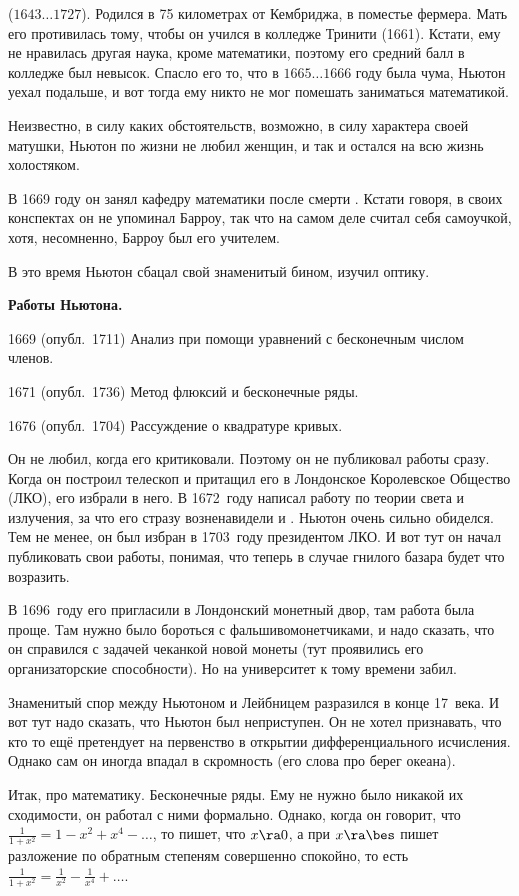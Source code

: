 \documentclass[a4paper,oneside,fleqn,10pt]{article}
\newcommand{\pe}[2]{${#1}\ldots{#2}$}
\begin{document}
 (\pe{1643}{1727}). Родился в 75
километрах от Кембриджа, в поместье фермера. Мать его противилась
тому, чтобы он учился в колледже Тринити (1661).  Кстати, ему не
нравилась другая наука, кроме математики, поэтому его средний балл в
колледже был невысок.  Спасло его то, что в \pe{1665}{1666} году была
чума, Ньютон уехал подальше, и вот тогда ему никто не мог помешать
заниматься математикой.

Неизвестно, в силу каких обстоятельств, возможно, в силу характера
своей матушки, Ньютон по жизни не любил женщин, и так и остался на всю
жизнь холостяком.

В 1669 году он занял кафедру математики после смерти .
Кстати говоря, в своих конспектах он не упоминал Барроу, так что на
самом деле считал себя самоучкой, хотя, несомненно, Барроу был его
учителем.

В это время Ньютон сбацал свой знаменитый бином, изучил оптику.


\textbf{Работы Ньютона.}

1669 (опубл.~1711) Анализ при помощи уравнений с бесконечным числом
членов.

1671 (опубл.~1736) Метод флюксий и бесконечные ряды.

1676 (опубл.~1704) Рассуждение о квадратуре кривых.

Он не любил, когда его критиковали. Поэтому он не публиковал работы
сразу.  Когда он построил телескоп и притащил его в Лондонское
Королевское Общество (ЛКО), его избрали в него.  В 1672~году написал
работу по теории света и излучения, за что его стразу возненавидели
 и .  Ньютон очень сильно обиделся. Тем не
менее, он был избран в 1703~году президентом ЛКО. И вот тут он начал
публиковать свои работы, понимая, что теперь в случае гнилого базара
будет что возразить.

В 1696~году его пригласили в Лондонский монетный двор, там работа была
проще.  Там нужно было бороться с фальшивомонетчиками, и надо сказать,
что он справился с задачей чеканкой новой монеты (тут проявились его
организаторские способности).  Но на университет к тому времени забил.

Знаменитый спор между Ньютоном и Лейбницем разразился в конце 17~века.
И вот тут надо сказать, что Ньютон был неприступен. Он не хотел
признавать, что кто то ещё претендует на первенство в открытии
дифференциального исчисления.  Однако сам он иногда впадал в
скромность (его слова про берег океана).

Итак, про математику. Бесконечные ряды. Ему не нужно было никакой их
сходимости, он работал с ними формально. Однако, когда он говорит, что
$\frac{1}{1+x^2} = 1 - x^2 + x^4-\dots$, то пишет, что $x \ra 0$, а
при $x \ra \bes$ пишет разложение по обратным степеням совершенно
спокойно, то есть $\frac{1}{1+x^2} = \frac{1}{x^2} - \frac{1}{x^4} +
\dots$.
\end{document}

